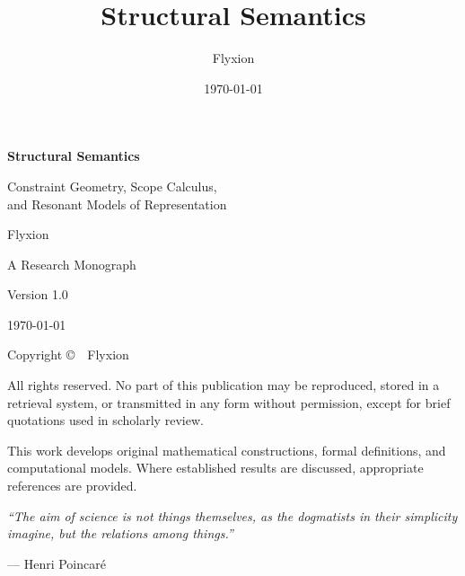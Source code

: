\documentclass[11pt,twoside,openright]{book}
\title{Structural Semantics}
\author{Flyxion}
\date{\today}
\numberwithin{equation}{chapter}
\theoremstyle{definition}
\theoremstyle{plain}
\theoremstyle{remark}
\theoremstyle{definition}
\begin{document}
\frontmatter

\begin{titlepage}
\centering
\vspace*{2cm}
{\Huge\bfseries Structural Semantics\par}
\vspace{1cm}
{\Large Constraint Geometry, Scope Calculus,\\ and Resonant Models of Representation\par}
\vspace{2cm}
{\Large Flyxion\par}
\vfill
A Research Monograph
\vspace{0.5cm}

Version 1.0
\vspace{2cm}

{\large \today}
\end{titlepage}
\cleardoublepage

\thispagestyle{empty}
\vspace*{\fill}
\begin{center}
Copyright \copyright\ \the\year\ Flyxion

All rights reserved. No part of this publication may be reproduced, stored
in a retrieval system, or transmitted in any form without permission,
except for brief quotations used in scholarly review.

This work develops original mathematical constructions, formal definitions,
and computational models. Where established results are discussed,
appropriate references are provided.
\end{center}
\vspace*{\fill}
\cleardoublepage

\thispagestyle{empty}
\vspace*{0.25\textheight}
\begin{flushright}
\itshape
``The aim of science is not things themselves, as the dogmatists in their
simplicity imagine, but the relations among things.''
\vspace{1em}

--- Henri Poincar\'e
\end{flushright}
\cleardoublepage
\end{document}
